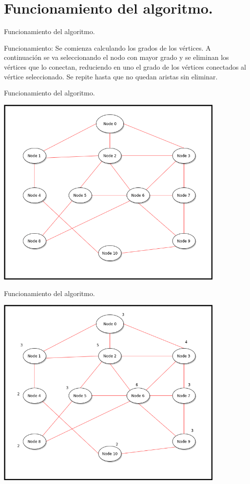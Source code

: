 \documentclass[10pt]{beamer}
\begin{document}
\section{Funcionamiento del algoritmo.}
\begin{frame}{Funcionamiento del algoritmo.}{}
  \begin{block}{Funcionamiento:}
    Se comienza calculando los grados de los vértices. A continuación se va seleccionando el nodo con mayor grado y se eliminan los vértices que lo conectan, reduciendo en uno el grado de los vértices conectados al vértice seleccionado. Se repite hasta que no quedan aristas sin eliminar.
    \end{block}
\end{frame}

\begin{frame}{Funcionamiento del algoritmo.}{}
	\begin{block}{}
		\includegraphics[width=0.85\textwidth]{gif-0.png}
	\end{block}
\end{frame}
\begin{frame}{Funcionamiento del algoritmo.}{}
	\begin{block}{}
		\includegraphics[width=0.85\textwidth]{gif-1.png}
	\end{block}
\end{frame}
\end{document}
